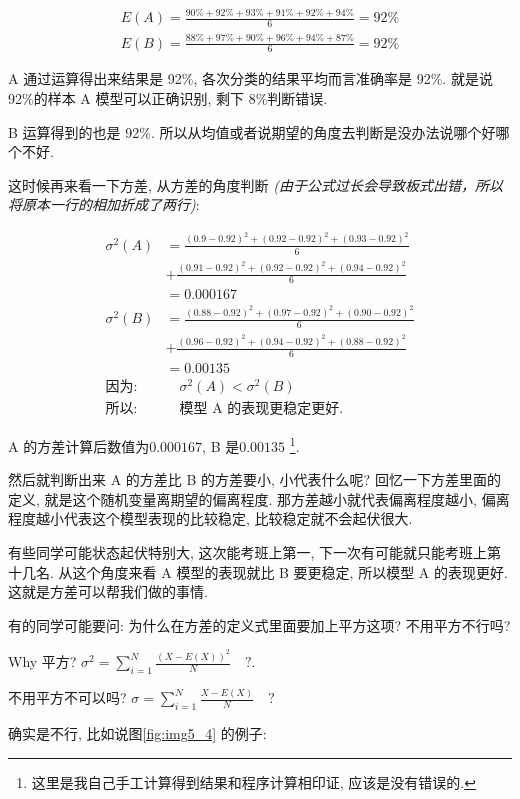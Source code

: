 \begin{align*}
  E(A) = \frac{90\% + 92\% + 93\% + 91\% + 92\% + 94\%}{6} = 92\% \\
  E(B) = \frac{88\% + 97\% + 90\% + 96\% + 94\% + 87\%}{6} = 92\%
\end{align*}

A 通过运算得出来结果是 92\%, 各次分类的结果平均而言准确率是 92\%. 就是说 92\%的样本 A 模型可以正确识别, 剩下 8\%判断错误. 

B 运算得到的也是 92\%. 所以从均值或者说期望的角度去判断是没办法说哪个好哪个不好. 

这时候再来看一下方差, 从方差的角度判断 \textit{(由于公式过长会导致板式出错，所以将原本一行的相加折成了两行)}:

\begin{align*}
  \sigma^2(A) & = \frac{(0.9-0.92)^2 + (0.92-0.92)^2 + (0.93-0.92)^2}{6} \\ & + \frac{(0.91-0.92)^2 + (0.92-0.92)^2 + (0.94-0.92)^2}{6} \\ 
  & = 0.000167 \\
  \sigma^2(B) & = \frac{(0.88-0.92)^2 + (0.97-0.92)^2 + (0.90-0.92)^2}{6} \\ & + \frac{(0.96-0.92)^2 + (0.94-0.92)^2 + (0.88-0.92)^2}{6} \\
  & = 0.00135 \\ 
  \mbox{因为}: & \quad  \sigma^2(A) < \sigma^2(B) \\
  \mbox{所以}: & \quad \mbox{模型 A 的表现更稳定更好. }
\end{align*}

A 的方差计算后数值为$0.000167$, B 是$0.00135$ \footnote{这里是我自己手工计算得到结果和程序计算相印证, 应该是没有错误的. }. 

然后就判断出来 A 的方差比 B 的方差要小, 小代表什么呢? 回忆一下方差里面的定义, 就是这个随机变量离期望的偏离程度. 那方差越小就代表偏离程度越小, 偏离程度越小代表这个模型表现的比较稳定, 比较稳定就不会起伏很大. 

有些同学可能状态起伏特别大, 这次能考班上第一, 下一次有可能就只能考班上第十几名. 从这个角度来看 A 模型的表现就比 B 要更稳定, 所以模型 A 的表现更好. 这就是方差可以帮我们做的事情. 

有的同学可能要问: 为什么在方差的定义式里面要加上平方这项? 不用平方不行吗? 

Why 平方? $\sigma^2 = \sum^N_{i=1}\frac{(X-E(X))^2}{N} \quad ?$.

不用平方不可以吗? $\sigma = \sum^N_{i=1}\frac{X-E(X)}{N} \quad ?$

确实是不行, 比如说图\ref{fig:img5_4} 的例子:


